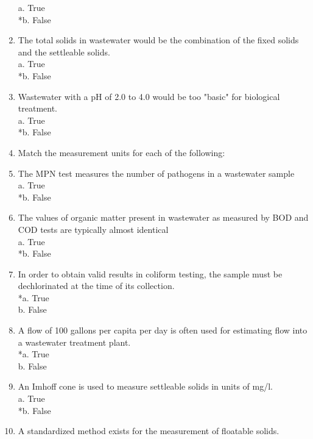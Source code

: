 \begin{enumerate}
a. True \\
*b. False 

\item  The total solids in wastewater would be the combination of the fixed solids and the settleable solids. \\

a. True \\
*b. False 

\item  Wastewater with a pH of 2.0 to 4.0 would be too "basic" for biological treatment. \\

a. True \\
*b. False 

\item  Match the measurement units for each of the following: 

\item  The MPN test measures the number of pathogens in a wastewater sample \\

a. True \\
*b. False 

\item  The values of organic matter present in wastewater as measured by BOD and COD tests are typically almost identical \\

a. True \\
*b. False 

\item  In order to obtain valid results in coliform testing, the sample must be dechlorinated at the time of its collection. \\

*a. True \\
b. False 

\item  A flow of 100 gallons per capita per day is often used for estimating flow into a wastewater treatment plant. \\

*a. True \\
b. False 

\item  An Imhoff cone is used to measure settleable solids in units of mg/l. \\

a. True \\
*b. False 

\item  A standardized method exists for the measurement of floatable solids. \\


\end{enumerate}
